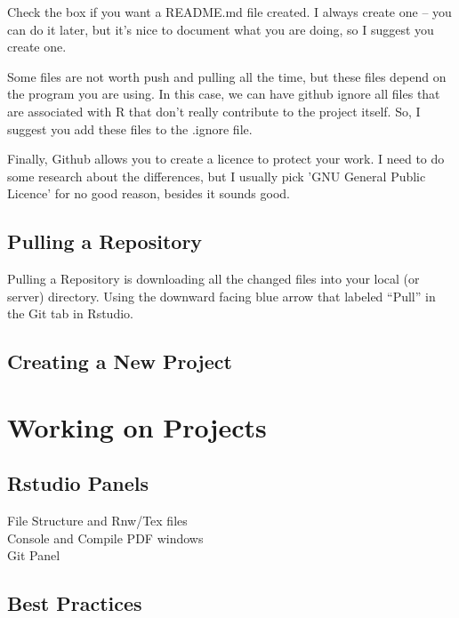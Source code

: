 \documentclass[12pt]{../SOP3_beta}
\begin{document}
\NP Check the box if you want a README.md file created. I always create one -- you can do it later, but it's nice to document what you are doing, so I suggest you create one.

\NP Some files are not worth push and pulling all the time, but these files depend on the program you are using. In this case, we can have github ignore all files that are associated with R that don't really contribute to the project itself. So, I suggest you add these files to the .ignore file. 

\NP Finally, Github allows you to create a licence to protect your work. I need to do some research about the differences, but I usually pick 'GNU General Public Licence' for no good reason, besides it sounds good.

\subsection{Pulling a Repository}

\NP Pulling a Repository is downloading all the changed files into your local (or server) directory. Using the downward facing blue arrow that labeled ``Pull'' in the Git tab in Rstudio.

\subsection{Creating a New Project}


\section{Working on Projects}

\subsection{Rstudio Panels}

\begin{description}
  \item[File Structure and Rnw/Tex files]
  \item[Console and Compile PDF windows]
  \item[Git Panel]
\end{description}


\subsection{Best Practices}
\end{document}
